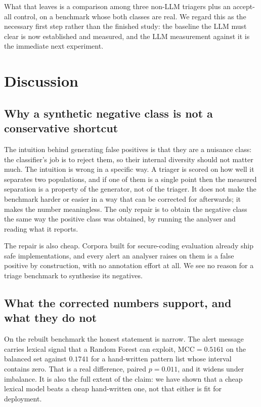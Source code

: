 \documentclass[journal]{IEEEtran}
\theoremstyle{definition}
\newcommand{\RHeurBalMcc}{0.1741}
\newcommand{\RTfidfBalMcc}{0.5161}
\newcommand{\RHeurVsTfidf}{0.011}
\begin{document}
What that leaves is a comparison among three non-LLM triagers plus an
accept-all control, on a benchmark whose both classes are real. We regard this
as the necessary first step rather than the finished study: the baseline the
LLM must clear is now established and measured, and the LLM measurement against
it is the immediate next experiment.

\section{Discussion}
\label{sec:discussion}

\subsection{Why a synthetic negative class is not a conservative shortcut}
The intuition behind generating false positives is that they are a nuisance
class: the classifier's job is to reject them, so their internal diversity
should not matter much. The intuition is wrong in a specific way. A triager is
scored on how well it separates two populations, and if one of them is a single
point then the measured separation is a property of the generator, not of the
triager. It does not make the benchmark harder or easier in a way that can be
corrected for afterwards; it makes the number meaningless. The only repair is to
obtain the negative class the same way the positive class was obtained, by
running the analyser and reading what it reports.

The repair is also cheap. Corpora built for secure-coding evaluation already
ship safe implementations, and every alert an analyser raises on them is a false
positive by construction, with no annotation effort at all. We see no reason for
a triage benchmark to synthesise its negatives.

\subsection{What the corrected numbers support, and what they do not}
On the rebuilt benchmark the honest statement is narrow. The alert message
carries lexical signal that a Random Forest can exploit,
$\mathrm{MCC} = \RTfidfBalMcc$ on the balanced set against $\RHeurBalMcc$ for a
hand-written pattern list whose interval contains zero. That is a real
difference, paired $p = \RHeurVsTfidf$, and it widens under imbalance. It is
also the full extent of the claim: we have shown that a cheap lexical model
beats a cheap hand-written one, not that either is fit for deployment.
\end{document}
